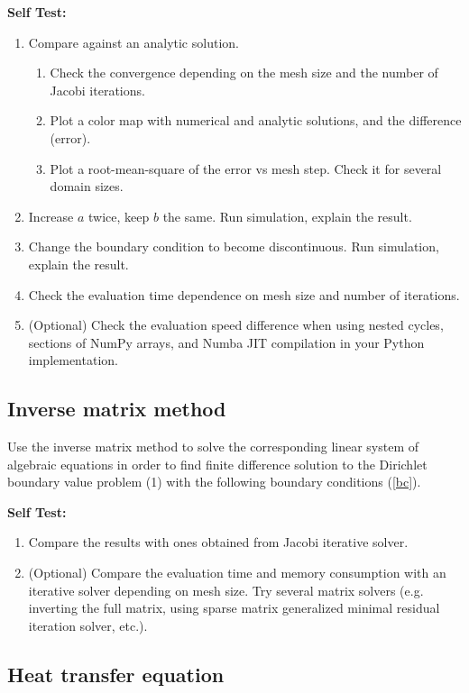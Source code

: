 \documentclass[11pt]{article}
\begin{document}
\textbf{Self Test:}
\begin{enumerate}
\item Compare against an analytic solution.
\begin{enumerate}
\item Check the convergence depending on the mesh size and the number of Jacobi iterations.
\item Plot a color map with numerical and analytic solutions, and the difference (error).
\item Plot a root-mean-square of the error vs mesh step. Check it for several domain sizes.
\end{enumerate}
\item Increase $a$ twice, keep $b$ the same. Run simulation, explain the result. 
\item Change the boundary condition to become discontinuous.  Run simulation, explain the result.
\item Check the evaluation time dependence on mesh size and number of iterations. 
\item (Optional) Check the evaluation speed difference when using nested cycles, sections of NumPy arrays, and Numba JIT compilation in your Python implementation.
\end{enumerate}
 
 

\subsection{Inverse matrix method}
\label{sec:inverse-matr-meth}
 
Use the inverse matrix method to solve the corresponding linear system
of algebraic equations in order to find finite difference solution
to the Dirichlet boundary value problem (1) with the following
boundary conditions (\ref{bc}).

\textbf{Self Test:}
\begin{enumerate}
\item Compare the results with ones obtained from Jacobi iterative solver.
\item (Optional) Compare the evaluation time and memory consumption with an iterative solver depending on mesh size. Try several matrix solvers (e.g. inverting the full matrix, using sparse matrix generalized minimal residual iteration solver, etc.). 
\end{enumerate}

\subsection{Heat transfer equation}
\end{document}
